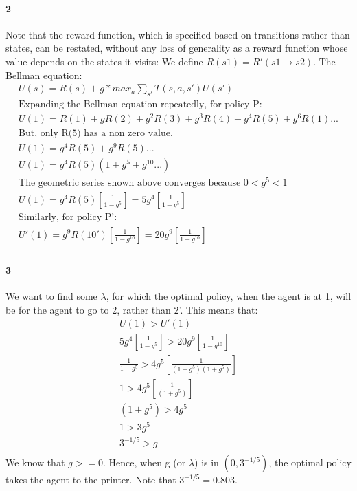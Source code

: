 \documentclass[10pt]{article}
\begin{document}
\paragraph{2} 
Note that the reward function, which is specified based on transitions rather than states, can be restated, without any loss of generality as a reward function whose value depends on the states it visits: We define $R(s1)=R'(s1\rightarrow s2)$. The Bellman equation:
\begin{eqnarray}
U(s)=R(s)+g*max_{a}\sum_{s'}T(s,a,s')U(s')\\
\text{Expanding the Bellman equation repeatedly, for policy P:}\\
U(1)=R(1)+gR(2)+g^{2}R(3)+g^{3}R(4)+g^{4}R(5)+g^{6}R(1)...\\
\text{But, only R(5) has a non zero value.}\\
U(1)=g^{4}R(5)+g^{9}R(5)...\\
U(1)=g^{4}R(5)(1+g^{5}+g^{10}...)\\
\text{The geometric series shown above converges because }0<g^{5}<1\\
U(1)=g^{4}R(5)[\frac{1}{1-g^{5}}]=5g^{4}[\frac{1}{1-g^{5}}]\\
\text{Similarly, for policy P':}\\
U'(1)=g^{9}R(10')[\frac{1}{1-g^{10}}]=20g^{9}[\frac{1}{1-g^{10}}]\\
\end{eqnarray}

\paragraph{3} 
We want to find some $\lambda$, for which the optimal policy, when the agent is at 1, will be for the agent to go to 2, rather than 2'. This means that:
\begin{eqnarray}
U(1)>U'(1)\\
5g^{4}[\frac{1}{1-g^{5}}]>20g^{9}[\frac{1}{1-g^{10}}]\\
\frac{1}{1-g^{5}}>4g^{5}[\frac{1}{(1-g^{5})(1+g^{5})}]\\
1>4g^{5}[\frac{1}{(1+g^{5})}]\\
(1+g^{5})>4g^{5}\\
1>3g^{5}\\
3^{-1/5}>g\\
\end{eqnarray}
We know that $g>=0$. Hence, when g (or $\lambda$) is in $(0,3^{-1/5})$, the optimal policy takes the agent to the printer. Note that $3^{-1/5}=0.803$.
\end{document}
